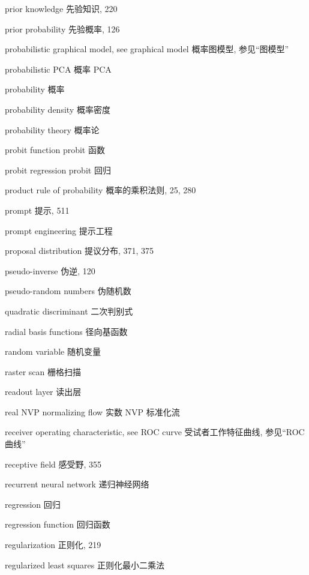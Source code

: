 prior knowledge  先验知识, 220 \par
prior probability  先验概率, 126 \par
probabilistic graphical model, see graphical model  概率图模型, 参见“图模型” \par
probabilistic PCA  概率 PCA \par
probability  概率 \par
probability density  概率密度 \par
probability theory  概率论 \par
probit function  probit 函数 \par
probit regression  probit 回归 \par
product rule of probability  概率的乘积法则, 25, 280 \par
prompt  提示, 511 \par
prompt engineering  提示工程 \par
proposal distribution  提议分布, 371, 375 \par
pseudo-inverse  伪逆, 120 \par
pseudo-random numbers  伪随机数 \par
quadratic discriminant  二次判别式 \par
radial basis functions  径向基函数 \par
random variable  随机变量 \par
raster scan  栅格扫描 \par
readout layer  读出层 \par
real NVP normalizing flow  实数 NVP 标准化流 \par
receiver operating characteristic, see ROC curve  受试者工作特征曲线, 参见“ROC 曲线” \par
receptive field  感受野, 355 \par
recurrent neural network  递归神经网络 \par
regression  回归 \par
regression function  回归函数 \par
regularization  正则化, 219 \par
regularized least squares  正则化最小二乘法 \par

